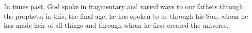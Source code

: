 
\lettrine{I}{}n times past, God spoke in fragmentary and varied ways to our fathers through the prophets; in this, the final age, he has spoken to us through his Son, whom he has made heir of all things and through whom he first created the universe.
